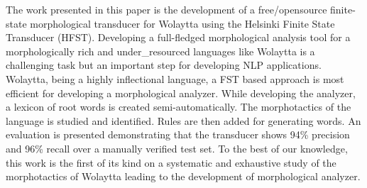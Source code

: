 The work presented in this paper is the development of a free/opensource finite-state morphological transducer for Wolaytta using the Helsinki Finite State Transducer (HFST). Developing a full-fledged morphological analysis tool for a morphologically rich and under\_resourced languages like Wolaytta is a challenging task but an important step for developing NLP applications. Wolaytta, being a highly inflectional language, a FST based approach is most efficient for developing a morphological analyzer. While developing the analyzer, a lexicon of root words is created semi-automatically. The morphotactics of the language is studied and identified. Rules are then added for generating words. An evaluation is presented demonstrating that the transducer shows 94\% precision and 96\% recall over a manually verified test set. To the best of our knowledge, this work is the first of its kind on a systematic and exhaustive study of the morphotactics of Wolaytta leading to the development of morphological analyzer.
